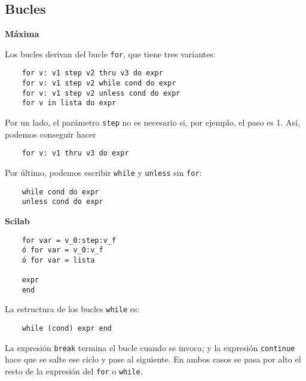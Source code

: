 \documentclass[a4paper]{article}
\begin{document}
\subsection{Bucles}
\begin{multicols}{2}
	\begin{center}
		\textbf{Máxima}
	\end{center}
	Los bucles derivan del bucle \verb|for|, que tiene tres variantes:
	
	\begin{verbatim}
	for v: v1 step v2 thru v3 do expr
	for v: v1 step v2 while cond do expr
	for v: v1 step v2 unless cond do expr
	for v in lista do expr
	\end{verbatim}
	
	Por un lado, el parámetro \verb|step| no es necesario si, por ejemplo, el paso es 1.
	Así, podemos conseguir hacer
	\begin{verbatim}
	for v: v1 thru v3 do expr
	\end{verbatim}
	
	Por último, podemos escribir \verb|while| y \verb|unless| sin \verb|for|:
	\begin{verbatim}
	while cond do expr
	unless cond do expr
	\end{verbatim}
	
	\columnbreak
	
	\begin{center}
		\textbf{Scilab}
	\end{center}
	\begin{verbatim}
 	for var = v_0:step:v_f
 	ó for var = v_0:v_f
 	ó for var = lista
 	
 	expr
 	end
	\end{verbatim}
	
	La estructura de los bucles \verb|while| es:
	\begin{verbatim}
	while (cond) expr end
	\end{verbatim}
	
	La expresión \verb|break| termina el bucle cuando se invoca; y la expresión \verb|continue| hace que se salte ese ciclo y pase al siguiente. En ambos casos se pasa por alto el resto de la expresión del \verb|for| o \verb|while|.
\end{multicols}

\raggedright
\end{document}

